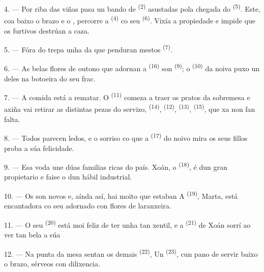 4. --- Por riba das viñas pasa un bando de  \textsuperscript{(2)} asustadas
pola chegada do  \textsuperscript{(5)}. Este, coa
 baixo o brazo e o , percorre
a  \textsuperscript{(4)} co seu  \textsuperscript{(6)}. Vixía a
propiedade e impide que os furtivos destrúan a caza.

5. --- Fóra do  trepa unha  da que penduran mestos
 \textsuperscript{(7)}.

6. --- As belas flores de outono que adornan a  \textsuperscript{(16)} son
 \textsuperscript{(9)}; o  \textsuperscript{(10)} da noiva
puxo un deles na botoeira do seu frac.

7. --- A comida está a rematar. O  \textsuperscript{(11)} comeza a traer os
pratos da sobremesa e axiña vai retirar as distintas pezas do servizo,
 \textsuperscript{(14)},  \textsuperscript{(12)},
 \textsuperscript{(13)},  \textsuperscript{(15)}, que
xa non fan falta.

\VUsaut{3.0mm}

8. --- Todos parecen ledos, e o sorriso co que a  \textsuperscript{(17)} do noivo
mira os seus fillos proba a súa felicidade.

9. --- Esa voda une dúas familias ricas do país. Xoán, o 
\textsuperscript{(18)}, é  dun gran propietario e faise o
 dun hábil industrial.

10. --- Os  son novos e, aínda así, hai moito que estaban
 A  \textsuperscript{(19)}, Marta, está
encantadora co seu  adornado con flores de laranxeira.

11. --- O seu  \textsuperscript{(20)} está moi feliz de ter unha
 tan xentil, e a  \textsuperscript{(21)} de Xoán sorrí ao
ver tan bela a súa 

12. --- Na punta da mesa sentan os demais  \textsuperscript{(22)},
 Un 
\textsuperscript{(23)}, cun pano de servir baixo o brazo, sérveos con dilixencia.

